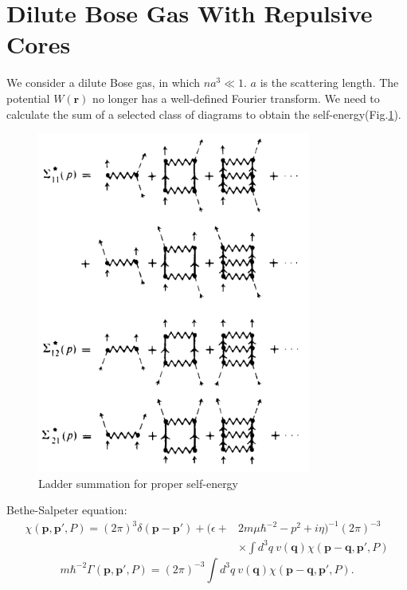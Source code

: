 \documentclass[12pt]{article}
\begin{document}
\section{Dilute Bose Gas With Repulsive Cores}
We consider a dilute Bose gas, in which $na^3\ll 1$. $a$ is the scattering length.
The potential $W(\mathbf{r})$ no longer has a well-defined Fourier transform. 
We need to calculate the sum of a selected class of diagrams to obtain the 
self-energy(Fig.\ref{img9}).
\begin{figure}[H]
    \centering
    \includegraphics[width=9cm]{p9.png}
    \renewcommand{\figurename}{Fig.}
    \caption{Ladder summation for proper self-energy}
    \label{img9}
\end{figure}
\noindent Bethe-Salpeter equation:
\begin{equation}
    \begin{aligned}
        \chi\left(\mathbf{p}, \mathbf{p}',P\right)=(2\pi)^{3}\delta(\mathbf{p}-
        \mathbf{p}')+\big(\epsilon+&2m\mu \hbar^{-2}-p^{2}+i\eta\big)^{-1}(2\pi)^{-3}\\
        &\times\int d^3q\ v(\mathbf{q})\chi\left(\mathbf{p}-\mathbf{q},\mathbf{p}',P\right)
        \end{aligned}
\end{equation}
\begin{equation}
    m\hbar^{-2}\Gamma\left(\mathbf{p}, \mathbf{p}',P\right)=(2\pi)^{-3}\int d^3q\ v
    (\mathbf{q})\chi\left(\mathbf{p}-\mathbf{q}, \mathbf{p}', P\right).
\end{equation}
\end{document}
